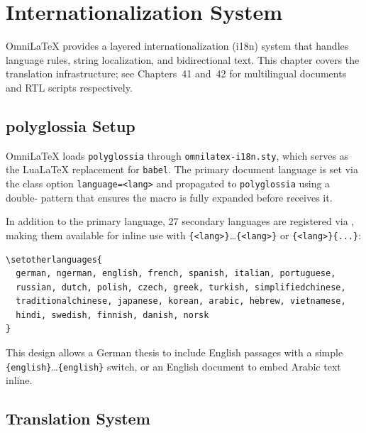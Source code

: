 \chapter{Internationalization System}
\label{ch:i18n-system}

OmniLaTeX provides a layered internationalization (i18n) system that handles
language rules, string localization, and bidirectional text.  This chapter
covers the translation infrastructure; see Chapters~41 and~42 for multilingual
documents and RTL scripts respectively.

\section{polyglossia Setup}

OmniLaTeX loads \texttt{polyglossia} through \texttt{omnilatex-i18n.sty},
which serves as the LuaLaTeX replacement for \texttt{babel}.  The primary
document language is set via the class option \texttt{language=<lang>} and
propagated to \texttt{polyglossia} using a double- pattern
that ensures the macro is fully expanded before 
receives it.

In addition to the primary language, 27 secondary languages are registered
via , making them available for inline use with
\texttt{\{<lang>\}}\ldots{}\texttt{\{<lang>\}} or
\texttt{\{<lang>\}\{...\}}:

\begin{verbatim}
\setotherlanguages{
  german, ngerman, english, french, spanish, italian, portuguese,
  russian, dutch, polish, czech, greek, turkish, simplifiedchinese,
  traditionalchinese, japanese, korean, arabic, hebrew, vietnamese,
  hindi, swedish, finnish, danish, norsk
}
\end{verbatim}

This design allows a German thesis to include English passages with a simple
\texttt{\{english\}}\ldots{}\texttt{\{english\}} switch,
or an English document to embed Arabic text inline.

\section{Translation System}

